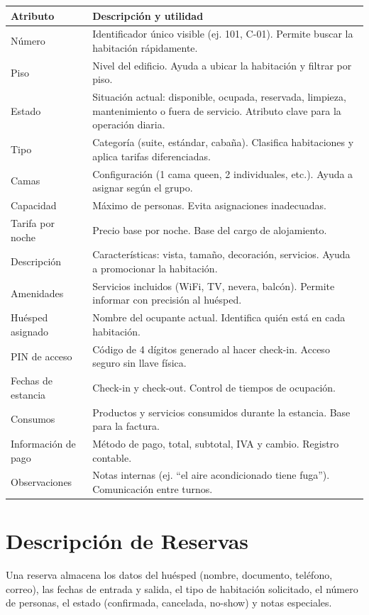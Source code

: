 \documentclass[12pt,a4paper]{article}
\begin{document}
\small
\begin{tabularx}{\textwidth}{lX}
\toprule
\textbf{Atributo} & \textbf{Descripción y utilidad} \\
\midrule
Número & Identificador único visible (ej. 101, C-01). Permite buscar la habitación rápidamente. \\
Piso & Nivel del edificio. Ayuda a ubicar la habitación y filtrar por piso. \\
Estado & Situación actual: disponible, ocupada, reservada, limpieza, mantenimiento o fuera de servicio. Atributo clave para la operación diaria. \\
Tipo & Categoría (suite, estándar, cabaña). Clasifica habitaciones y aplica tarifas diferenciadas. \\
Camas & Configuración (1 cama queen, 2 individuales, etc.). Ayuda a asignar según el grupo. \\
Capacidad & Máximo de personas. Evita asignaciones inadecuadas. \\
Tarifa por noche & Precio base por noche. Base del cargo de alojamiento. \\
Descripción & Características: vista, tamaño, decoración, servicios. Ayuda a promocionar la habitación. \\
Amenidades & Servicios incluidos (WiFi, TV, nevera, balcón). Permite informar con precisión al huésped. \\
Huésped asignado & Nombre del ocupante actual. Identifica quién está en cada habitación. \\
PIN de acceso & Código de 4 dígitos generado al hacer check-in. Acceso seguro sin llave física. \\
Fechas de estancia & Check-in y check-out. Control de tiempos de ocupación. \\
Consumos & Productos y servicios consumidos durante la estancia. Base para la factura. \\
Información de pago & Método de pago, total, subtotal, IVA y cambio. Registro contable. \\
Observaciones & Notas internas (ej. ``el aire acondicionado tiene fuga''). Comunicación entre turnos. \\
\bottomrule
\end{tabularx}
\normalsize

\section{Descripción de Reservas}

Una reserva almacena los datos del huésped (nombre, documento, teléfono, correo), las fechas de entrada y salida, el tipo de habitación solicitado, el número de personas, el estado (confirmada, cancelada, no-show) y notas especiales.
\end{document}
